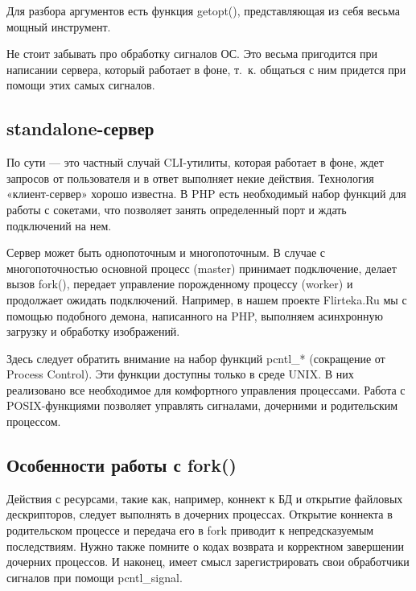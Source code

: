 \documentclass[10pt, a5paper]{article}
\begin{document}
Для разбора аргументов есть функция getopt(), представляющая из себя весьма мощный инструмент.

Не стоит забывать про обработку сигналов ОС. Это весьма пригодится при написании сервера, который работает в фоне, т.~к. общаться с ним придется при помощи этих самых сигналов.

\subsection*{standalone-сервер}

По сути --- это частный случай CLI-утилиты, которая работает в фоне, ждет запросов от пользователя и в ответ выполняет некие действия. Технология «клиент-сервер» хорошо известна. В PHP есть необходимый набор функций для работы с сокетами, что позволяет занять определенный порт и ждать подключений на нем.

Сервер может быть однопоточным и многопоточным. В случае с многопоточностью основной процесс (master) принимает подключение, делает вызов fork(), передает управление порожденному процессу (worker) и продолжает ожидать подключений. Например, в нашем проекте Flirteka.Ru мы с помощью подобного демона, написанного на PHP, выполняем асинхронную загрузку и обработку изображений.

Здесь следует обратить внимание на набор функций pcntl\_* (сокращение от Process Control). Эти функции доступны только в среде UNIX. В них реализовано все необходимое для комфортного управления процессами. Работа с POSIX-функциями позволяет управлять сигналами, дочерними и родительским процессом.

\subsection*{Особенности работы с fork()}

Действия с ресурсами, такие как, например, коннект к БД и открытие файловых дескрипторов, следует выполнять в дочерних процессах. Открытие коннекта в родительском процессе и передача его в fork приводит к непредсказуемым последствиям. 
Нужно также помните о кодах возврата и корректном завершении дочерних процессов. И наконец, имеет смысл зарегистрировать свои обработчики сигналов при помощи pcntl\_signal.
\end{document}
